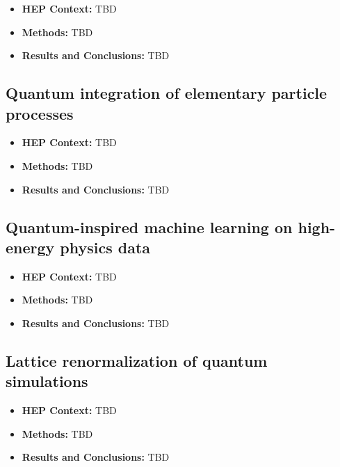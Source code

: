 \begin{itemize}
	\item \textbf{HEP Context: }TBD
	\item \textbf{Methods: }TBD
	\item \textbf{Results and Conclusions: }TBD
\end{itemize}\subsection{Quantum integration of elementary particle processes~\cite{Agliardi:2022ghn}}
\begin{itemize}
	\item \textbf{HEP Context: }TBD
	\item \textbf{Methods: }TBD
	\item \textbf{Results and Conclusions: }TBD
\end{itemize}\subsection{Quantum-inspired machine learning on high-energy physics data~\cite{Felser:2020mka}}
\begin{itemize}
	\item \textbf{HEP Context: }TBD
	\item \textbf{Methods: }TBD
	\item \textbf{Results and Conclusions: }TBD
\end{itemize}\subsection{Lattice renormalization of quantum simulations~\cite{Carena:2021ltu}}
\begin{itemize}
	\item \textbf{HEP Context: }TBD
	\item \textbf{Methods: }TBD
	\item \textbf{Results and Conclusions: }TBD
\end{itemize}

